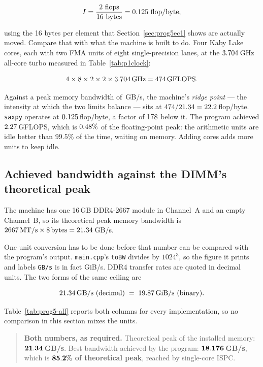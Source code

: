\documentclass[11pt,a4paper]{article}
\begin{document}
\[
I = \frac{2 \text{ flops}}{16 \text{ bytes}} = 0.125 \text{ flop/byte},
\]

using the 16 bytes per element that Section~\ref{sec:prog5ec1} shows are
actually moved. Compare that with what the machine is built to do. Four
Kaby Lake cores, each with two FMA units of eight single-precision lanes, at
the $3.704$\,GHz all-core turbo measured in Table~\ref{tab:p1clock}:

\[
4 \times 8 \times 2 \times 2 \times 3.704\,\text{GHz}
= 474\,\text{GFLOPS}.
\]

Against a peak memory bandwidth of \prognFivePeakGBs\,GB/s, the machine's
\emph{ridge point} --- the intensity at which the two limits balance --- sits at
$474 / 21.34 = 22.2$\,flop/byte. \texttt{saxpy} operates at
$0.125$\,flop/byte, a factor of $178$ below it. The program achieved
$2.27$\,GFLOPS, which is $0.48\%$ of the floating-point peak: the arithmetic
units are idle better than $99.5\%$ of the time, waiting on memory. Adding
cores adds more units to keep idle.

\subsection{Achieved bandwidth against the DIMM's theoretical peak}

The machine has one 16\,GB DDR4-2667 module in Channel~A and an empty
Channel~B, so its theoretical peak memory bandwidth is
$2667\,\text{MT/s} \times 8\,\text{bytes} = 21.34$\,GB/s.

One unit conversion has to be done before that number can be compared with the
program's output. \texttt{main.cpp}'s \texttt{toBW} divides by $1024^3$, so the
figure it prints and labels \texttt{GB/s} is in fact GiB/s. DDR4 transfer rates
are quoted in decimal units. The two forms of the same ceiling are

\[
21.34\,\text{GB/s (decimal)}
\;=\;
19.87\,\text{GiB/s (binary)} .
\]

Table~\ref{tab:prog5-all} reports both columns for every implementation, so no
comparison in this section mixes the units.

\prognFiveTableAll

\begin{quote}
\textbf{Both numbers, as required.} Theoretical peak of the installed memory:
$\mathbf{21.34}$\,\textbf{GB/s}. Best bandwidth achieved by the
program: $\mathbf{18.176}$\,\textbf{GB/s}, which is
$\mathbf{85.2\%}$ \textbf{of theoretical peak}, reached by
single-core ISPC.
\end{quote}
\end{document}
